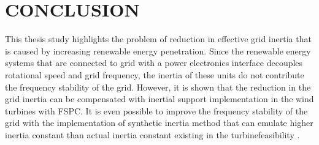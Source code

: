 \chapter{CONCLUSION}
\label{chp:7}
This thesis study highlights the problem of reduction in effective grid inertia that is caused by increasing renewable energy penetration. Since the renewable energy systems that are connected to grid with a power electronics interface decouples rotational speed and grid frequency, the inertia of these units do not contribute the frequency stability of the grid. However, it is shown that the reduction in the grid inertia can be compensated with inertial support implementation in the wind turbines with FSPC. It is even possible to improve the frequency stability of the grid with the implementation of synthetic inertia method that can emulate higher inertia constant than actual inertia constant existing in the turbinefeasibility . \par
